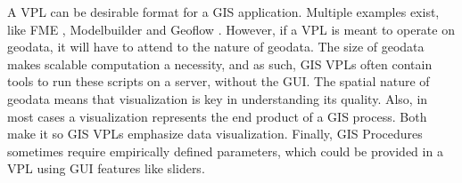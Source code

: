 A VPL can be desirable format for a \ac{GIS} application.
Multiple examples exist, like FME \citep{safe-software_fme_2022}, Modelbuilder \citep*{esri_modelbuilder_2022} and Geoflow \citep{peters_geoflow_2019}.
However, if a VPL is meant to operate on geodata, it will have to attend to the nature of geodata. 
The size of geodata makes scalable computation a necessity, and as such, GIS VPLs often contain tools to run these scripts on a server, without the \ac{GUI}. 
The spatial nature of geodata means that visualization is key in understanding its quality. 
Also, in most cases a visualization represents the end product of a \ac{GIS} process.
Both make it so GIS VPLs emphasize data visualization.  
Finally, \ac{GIS} Procedures sometimes require empirically defined parameters, which could be provided in a VPL using \ac{GUI} features like sliders. 













